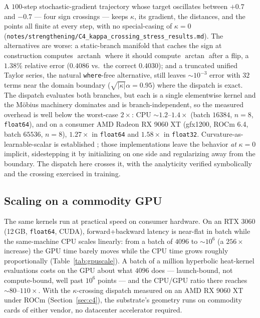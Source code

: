 \documentclass{article}
\newcommand{\kp}{\kappa}
\newcommand{\code}[1]{\texttt{#1}}
\begin{document}
A $100$-step stochastic-gradient trajectory whose target oscillates
between $+0.7$ and $-0.7$ --- four sign crossings --- keeps $\kp$, its
gradient, the distances, and the points all finite at every step, with
no special-casing of $\kp = 0$
(\code{notes/strengthening/C4\_kappa\_crossing\_stress\_results.md}).
The alternatives are worse: a static-branch manifold that caches the
sign at construction computes $\operatorname{arctanh}$ where it should
compute $\arctan$ after a flip, a $1.38\%$ relative error ($0.4086$ vs.\
the correct $0.4030$); and a truncated unified Taylor series, the natural
\code{where}-free alternative, still leaves $\sim\!10^{-3}$ error with
$32$ terms near the domain boundary ($\sqrt{|\kp|}\alpha = 0.95$) where
the dispatch is exact. The dispatch evaluates both branches, but each is
a single elementwise kernel and the M\"obius machinery dominates and is
branch-independent, so the measured overhead is well below the
worst-case $2\times$: CPU $\sim\!1.2$--$1.4\times$ (batch $16384$,
$n=8$, \code{float64}), and on a consumer AMD Radeon RX 9060 XT (gfx1200,
ROCm 6.4, batch $65536$, $n=8$), $1.27\times$ in \code{float64} and
$1.58\times$ in \code{float32}. Curvature-as-learnable-scalar is
established \citep{bachmann2020constant,skopek2020mixed}; those
implementations leave the behavior \emph{at} $\kp = 0$ implicit,
sidestepping it by initializing on one side and regularizing away from
the boundary. The dispatch here crosses it, with the analyticity
verified symbolically and the crossing exercised in training.

\subsection{Scaling on a commodity GPU}
\label{sec:gpuscale}

The same kernels run at practical speed on consumer hardware. On an
RTX 3060 (12\,GB, \code{float64}, CUDA), forward+backward latency is
near-flat in batch while the same-machine CPU scales linearly: from a
batch of $4096$ to $\sim\!10^6$ (a $256\times$ increase) the GPU time
barely moves while the CPU time grows roughly proportionally
(Table~\ref{tab:gpuscale}). A batch of a million hyperbolic heat-kernel
evaluations costs on the GPU about what $4096$ does --- launch-bound, not
compute-bound, well past $10^6$ points --- and the CPU/GPU ratio there
reaches $\sim\!80$--$110\times$. With the $\kp$-crossing dispatch measured
on an AMD RX 9060 XT under ROCm (Section~\ref{sec:c4}), the substrate's
geometry runs on commodity cards of either vendor, no datacenter
accelerator required.
\end{document}
